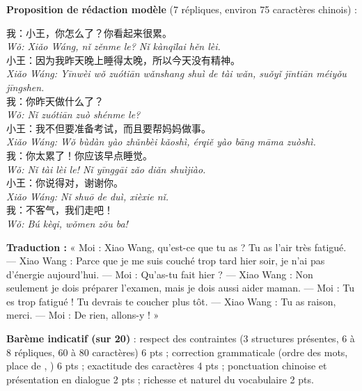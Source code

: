 \documentclass[11pt]{article}
\newcommand{\zh}[1]{\ifmmode\text{#1}\else{#1}\fi}
\begin{document}
\begin{corrige}

\textbf{Proposition de rédaction modèle} (7 répliques, environ 75 caractères chinois) :

\begin{textebox}
我：小王，你怎么了？你看起来很累。\\
\emph{Wǒ: Xiǎo Wáng, nǐ zěnme le? Nǐ kànqǐlai hěn lèi.}\\
小王：因为我昨天晚上睡得太晚，所以今天没有精神。\\
\emph{Xiǎo Wáng: Yīnwèi wǒ zuótiān wǎnshang shuì de tài wǎn, suǒyǐ jīntiān méiyǒu jīngshen.}\\
我：你昨天做什么了？\\
\emph{Wǒ: Nǐ zuótiān zuò shénme le?}\\
小王：我不但要准备考试，而且要帮妈妈做事。\\
\emph{Xiǎo Wáng: Wǒ bùdàn yào zhǔnbèi kǎoshì, érqiě yào bāng māma zuòshì.}\\
我：你太累了！你应该早点睡觉。\\
\emph{Wǒ: Nǐ tài lèi le! Nǐ yīnggāi zǎo diǎn shuìjiào.}\\
小王：你说得对，谢谢你。\\
\emph{Xiǎo Wáng: Nǐ shuō de duì, xièxie nǐ.}\\
我：不客气，我们走吧！\\
\emph{Wǒ: Bú kèqi, wǒmen zǒu ba!}
\end{textebox}

\textbf{Traduction :} « Moi : Xiao Wang, qu'est-ce que tu as ? Tu as l'air très fatigué. — Xiao Wang : Parce que je me suis couché trop tard hier soir, je n'ai pas d'énergie aujourd'hui. — Moi : Qu'as-tu fait hier ? — Xiao Wang : Non seulement je dois préparer l'examen, mais je dois aussi aider maman. — Moi : Tu es trop fatigué ! Tu devrais te coucher plus tôt. — Xiao Wang : Tu as raison, merci. — Moi : De rien, allons-y ! »

\textbf{Barème indicatif (sur 20)} : respect des contraintes (3 structures présentes, 6 à 8 répliques, 60 à 80 caractères) 6 pts ; correction grammaticale (ordre des mots, place de \zh{不但}, \zh{因为……所以……}) 6 pts ; exactitude des caractères 4 pts ; ponctuation chinoise et présentation en dialogue 2 pts ; richesse et naturel du vocabulaire 2 pts.


\end{corrige}
\end{document}
